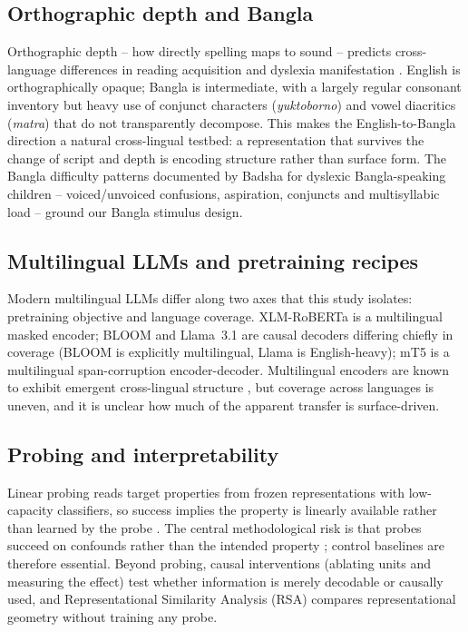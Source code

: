 \documentclass[conference]{IEEEtran}
\begin{document}
\subsection{Orthographic depth and Bangla}
Orthographic depth -- how directly spelling maps to sound -- predicts cross-language differences in reading acquisition and dyslexia manifestation \cite{ziegler2005reading}. English is orthographically opaque; Bangla is intermediate, with a largely regular consonant inventory but heavy use of conjunct characters (\textit{yuktoborno}) and vowel diacritics (\textit{matra}) that do not transparently decompose. This makes the English-to-Bangla direction a natural cross-lingual testbed: a representation that survives the change of script and depth is encoding structure rather than surface form. The Bangla difficulty patterns documented by Badsha \cite{badsha2024mall} for dyslexic Bangla-speaking children -- voiced/unvoiced confusions, aspiration, conjuncts and multisyllabic load -- ground our Bangla stimulus design.

\subsection{Multilingual LLMs and pretraining recipes}
Modern multilingual LLMs differ along two axes that this study isolates: pretraining objective and language coverage. XLM-RoBERTa \cite{conneau2020xlmr} is a multilingual masked encoder; BLOOM \cite{scao2022bloom} and Llama~3.1 \cite{dubey2024llama3} are causal decoders differing chiefly in coverage (BLOOM is explicitly multilingual, Llama is English-heavy); mT5 \cite{xue2021mt5} is a multilingual span-corruption encoder-decoder. Multilingual encoders are known to exhibit emergent cross-lingual structure \cite{pires2019mbert,wu2020emerging}, but coverage across languages is uneven, and it is unclear how much of the apparent transfer is surface-driven.

\subsection{Probing and interpretability}
Linear probing reads target properties from frozen representations with low-capacity classifiers, so success implies the property is linearly available rather than learned by the probe \cite{conneau2018probing,hewitt2019structural,belinkov2022probing}. The central methodological risk is that probes succeed on confounds rather than the intended property \cite{belinkov2022probing,pimentel2020information}; control baselines are therefore essential. Beyond probing, causal interventions (ablating units and measuring the effect) test whether information is merely decodable or causally used, and Representational Similarity Analysis (RSA) compares representational geometry without training any probe.
\end{document}

